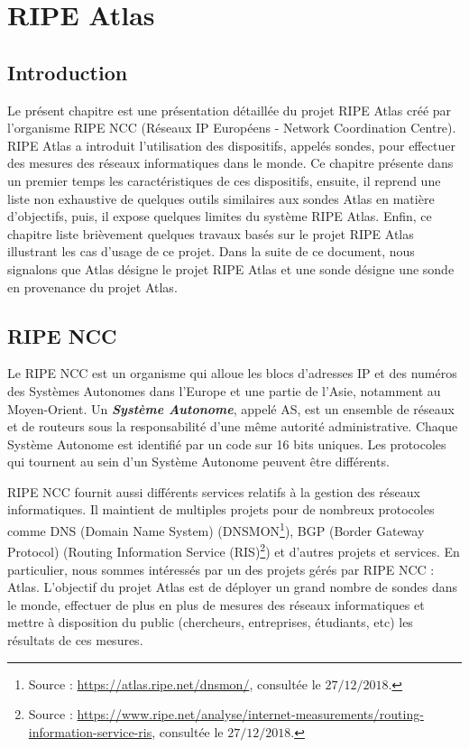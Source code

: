 
\chapter{RIPE Atlas}

\section{Introduction}
Le présent chapitre est une présentation détaillée du projet RIPE Atlas créé par l'organisme RIPE NCC (Réseaux IP Européens - Network Coordination Centre).  RIPE Atlas  a introduit l'utilisation des dispositifs, appelés sondes, pour  effectuer des mesures des réseaux informatiques dans le monde. Ce chapitre présente dans un premier temps les caractéristiques de ces dispositifs, ensuite, il  reprend une liste non exhaustive  de quelques outils similaires aux sondes Atlas en matière d'objectifs, puis, il expose quelques limites du système RIPE Atlas. Enfin, ce chapitre  liste  brièvement quelques travaux basés sur le projet RIPE Atlas illustrant les cas d'usage de ce projet. Dans la suite de ce document, nous signalons que Atlas désigne le projet RIPE Atlas et une sonde désigne une sonde en provenance  du projet Atlas.
\section{RIPE NCC}
Le RIPE NCC  est un organisme qui alloue les blocs d'adresses IP et des numéros des Systèmes Autonomes dans l'Europe et une partie de l'Asie, notamment au Moyen-Orient. Un\textit{ \textbf{Système Autonome}}, appelé AS, est un ensemble de réseaux et de routeurs sous la responsabilité d'une même autorité administrative. Chaque Système Autonome est identifié par un code sur 16 bits uniques. Les protocoles qui tournent au sein d'un Système Autonome peuvent être différents.


RIPE NCC fournit  aussi différents services relatifs à la gestion des réseaux informatiques. Il maintient de multiples projets  pour de nombreux  protocoles comme DNS (Domain Name System)  (DNSMON\footnote{Source : \url{https://atlas.ripe.net/dnsmon/}, consultée le $27/12/2018$.}), BGP (Border Gateway Protocol) (Routing Information Service  (RIS)\footnote{Source : \url{https://www.ripe.net/analyse/internet-measurements/routing-information-service-ris}, consultée le $27/12/2018$.}) et d'autres projets et services. En particulier, nous sommes intéressés  par un des projets   gérés  par RIPE NCC : Atlas. L'objectif du projet Atlas est de déployer un grand nombre de sondes dans le monde, effectuer de plus en plus  de mesures des réseaux informatiques et mettre à disposition du public (chercheurs, entreprises, étudiants, etc) les résultats de ces mesures.
